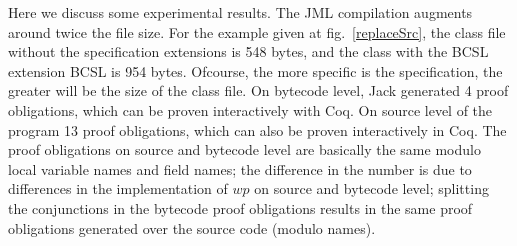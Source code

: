 
Here we discuss some experimental results. 
The JML compilation augments around twice the file size. 
For the example given at fig.~\ref{replaceSrc}, the class file without the specification extensions is 548 bytes, 
and the class with the BCSL extension BCSL is 954 bytes. Ofcourse, the more specific is the specification, the greater will be the size of the class file. 
On bytecode level, Jack generated 4 proof obligations, which can be proven interactively with Coq. On source level of the program 13 proof obligations, 
which can also be proven interactively in Coq. The proof obligations on source and bytecode level are basically the same modulo 
 local variable names and field names; the difference in the number is due to differences in the implementation of $wp$ on source and bytecode level; splitting the conjunctions in the bytecode proof obligations results in the same proof obligations generated over the source code (modulo names). 

